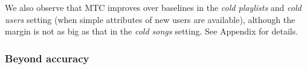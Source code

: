 
We also observe that MTC improves over baselines in the \emph{cold playlists}
and \emph{cold users} setting (when simple attributes of new users are available),
although the margin is not as big as that in the \emph{cold songs} setting.
See Appendix for details.




%        
%        


\subsubsection{Beyond accuracy}

